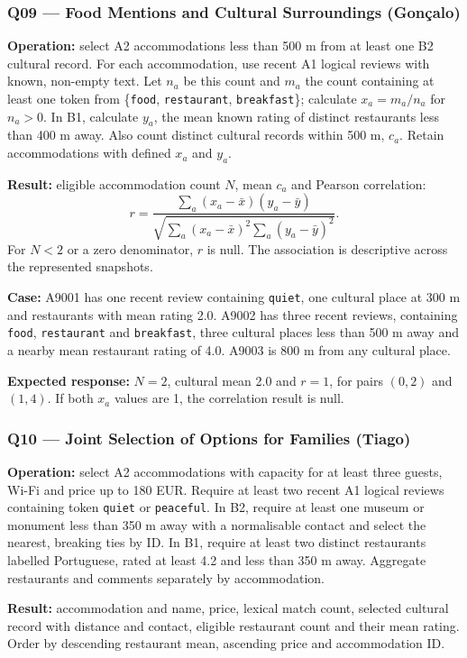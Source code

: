 \subsubsection{Q09 --- Food Mentions and Cultural Surroundings (Gonçalo)}
\textbf{Operation:} select A2 accommodations less than 500 m from at least one B2 cultural record. For each accommodation, use recent A1 logical reviews with known, non-empty text. Let \(n_a\) be this count and \(m_a\) the count containing at least one token from \{\texttt{food}, \texttt{restaurant}, \texttt{breakfast}\}; calculate \(x_a=m_a/n_a\) for \(n_a>0\). In B1, calculate \(y_a\), the mean known rating of distinct restaurants less than 400 m away. Also count distinct cultural records within 500 m, \(c_a\). Retain accommodations with defined \(x_a\) and \(y_a\).

\textbf{Result:} eligible accommodation count \(N\), mean \(c_a\) and Pearson correlation:
\[
r=\frac{\sum_a(x_a-\bar{x})(y_a-\bar{y})}
{\sqrt{\sum_a(x_a-\bar{x})^2\sum_a(y_a-\bar{y})^2}}.
\]
For \(N<2\) or a zero denominator, \(r\) is null. The association is descriptive across the represented snapshots.

\textbf{Case:} A9001 has one recent review containing \texttt{quiet}, one cultural place at 300 m and restaurants with mean rating 2.0. A9002 has three recent reviews, containing \texttt{food}, \texttt{restaurant} and \texttt{breakfast}, three cultural places less than 500 m away and a nearby mean restaurant rating of 4.0. A9003 is 800 m from any cultural place.\par
\textbf{Expected response:} \(N=2\), cultural mean 2.0 and \(r=1\), for pairs \((0,2)\) and \((1,4)\). If both \(x_a\) values are 1, the correlation result is null.
\subsubsection{Q10 --- Joint Selection of Options for Families (Tiago)}
\textbf{Operation:} select A2 accommodations with capacity for at least three guests, Wi-Fi and price up to 180 EUR. Require at least two recent A1 logical reviews containing token \texttt{quiet} or \texttt{peaceful}. In B2, require at least one museum or monument less than 350 m away with a normalisable contact and select the nearest, breaking ties by ID. In B1, require at least two distinct restaurants labelled Portuguese, rated at least 4.2 and less than 350 m away. Aggregate restaurants and comments separately by accommodation.

\textbf{Result:} accommodation and name, price, lexical match count, selected cultural record with distance and contact, eligible restaurant count and their mean rating. Order by descending restaurant mean, ascending price and accommodation ID.

